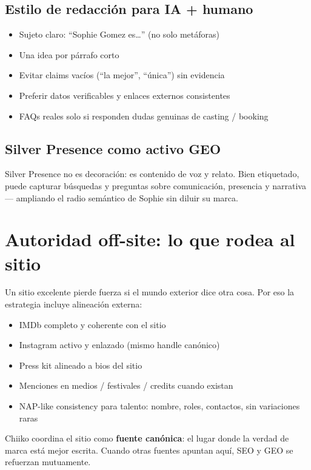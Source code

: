 \documentclass[11pt,a4paper]{article}
\begin{document}
\subsection{Estilo de redacción para IA + humano}
\begin{itemize}
  \item Sujeto claro: ``Sophie Gomez es\ldots'' (no solo metáforas)
  \item Una idea por párrafo corto
  \item Evitar claims vacíos (``la mejor'', ``única'') sin evidencia
  \item Preferir datos verificables y enlaces externos consistentes
  \item FAQs reales solo si responden dudas genuinas de casting / booking
\end{itemize}

\subsection{Silver Presence como activo GEO}
Silver Presence no es decoración: es contenido de voz y relato.
Bien etiquetado, puede capturar búsquedas y preguntas sobre comunicación,
presencia y narrativa --- ampliando el radio semántico de Sophie sin diluir su marca.

\section{Autoridad off-site: lo que rodea al sitio}

Un sitio excelente pierde fuerza si el mundo exterior dice otra cosa.
Por eso la estrategia incluye alineación externa:

\begin{itemize}
  \item IMDb completo y coherente con el sitio
  \item Instagram activo y enlazado (mismo handle canónico)
  \item Press kit alineado a bios del sitio
  \item Menciones en medios / festivales / credits cuando existan
  \item NAP-like consistency para talento: nombre, roles, contactos, sin variaciones raras
\end{itemize}

Chiiko coordina el sitio como \textbf{fuente canónica}:
el lugar donde la verdad de marca está mejor escrita.
Cuando otras fuentes apuntan aquí, SEO y GEO se refuerzan mutuamente.
\end{document}
